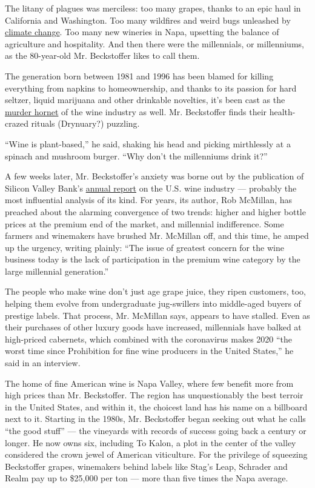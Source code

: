 The litany of plagues was merciless: too many grapes, thanks to an epic
haul in California and Washington. Too many wildfires and weird bugs
unleashed by
\href{https://www.nytimes3xbfgragh.onion/interactive/2019/10/14/dining/drinks/climate-change-wine.html}{climate
change}. Too many new wineries in Napa, upsetting the balance of
agriculture and hospitality. And then there were the millennials, or
millenniums, as the 80-year-old Mr. Beckstoffer likes to call them.

The generation born between 1981 and 1996 has been blamed for killing
everything from napkins to homeownership, and thanks to its passion for
hard seltzer, liquid marijuana and other drinkable novelties, it's been
cast as the
\href{https://www.nytimes3xbfgragh.onion/2020/05/02/us/asian-giant-hornet-washington.html}{murder
hornet} of the wine industry as well. Mr. Beckstoffer finds their
health-crazed rituals (Drynuary?) puzzling.

``Wine is plant-based,'' he said, shaking his head and picking
mirthlessly at a spinach and mushroom burger. ``Why don't the
millenniums drink it?''

A few weeks later, Mr. Beckstoffer's anxiety was borne out by the
publication of Silicon Valley Bank's
\href{https://www.svb.com/wine-report}{annual report} on the U.S. wine
industry --- probably the most influential analysis of its kind. For
years, its author, Rob McMillan, has preached about the alarming
convergence of two trends: higher and higher bottle prices at the
premium end of the market, and millennial indifference. Some farmers and
winemakers have brushed Mr. McMillan off, and this time, he amped up the
urgency, writing plainly: ``The issue of greatest concern for the wine
business today is the lack of participation in the premium wine category
by the large millennial generation.''

The people who make wine don't just age grape juice, they ripen
customers, too, helping them evolve from undergraduate jug-swillers into
middle-aged buyers of prestige labels. That process, Mr. McMillan says,
appears to have stalled. Even as their purchases of other luxury goods
have increased, millennials have balked at high-priced cabernets, which
combined with the coronavirus makes 2020 ``the worst time since
Prohibition for fine wine producers in the United States,'' he said in
an interview.

The home of fine American wine is Napa Valley, where few benefit more
from high prices than Mr. Beckstoffer. The region has unquestionably the
best terroir in the United States, and within it, the choicest land has
his name on a billboard next to it. Starting in the 1980s, Mr.
Beckstoffer began seeking out what he calls ``the good stuff'' --- the
vineyards with records of success going back a century or longer. He now
owns six, including To Kalon, a plot in the center of the valley
considered the crown jewel of American viticulture. For the privilege of
squeezing Beckstoffer grapes, winemakers behind labels like Stag's Leap,
Schrader and Realm pay up to \$25,000 per ton --- more than five times
the Napa average.

